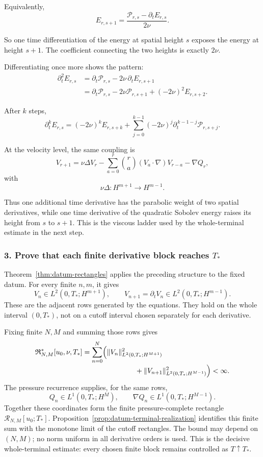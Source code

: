 \documentclass[11pt]{article}
\theoremstyle{definition}
\theoremstyle{remark}
\newcommand{\cR}{\mathcal R}
\begin{document}
Equivalently,
\[
\boxed{
E_{r,s+1}
=
\frac{\mathcal P_{r,s}-\partial_tE_{r,s}}{2\nu}.
}
\]

So one time differentiation of the energy at spatial height \(s\) exposes the
energy at height \(s+1\).  The coefficient connecting the two heights is
exactly \(2\nu\).

Differentiating once more shows the pattern:
\[
\begin{aligned}
\partial_t^2E_{r,s}
&=
\partial_t\mathcal P_{r,s}
-2\nu\,\partial_tE_{r,s+1} \\
&=
\partial_t\mathcal P_{r,s}
-2\nu\mathcal P_{r,s+1}
+(-2\nu)^2E_{r,s+2}.
\end{aligned}
\]

After \(k\) steps,
\[
\boxed{
\partial_t^kE_{r,s}
=
(-2\nu)^kE_{r,s+k}
+
\sum_{j=0}^{k-1}
(-2\nu)^j
\partial_t^{\,k-1-j}\mathcal P_{r,s+j}.
}
\]

At the velocity level, the same coupling is
\[
V_{r+1}
=
\nu\Delta V_r
-
\sum_{a=0}^{r}\binom ra(V_a\!\cdot\nabla)V_{r-a}
-\nabla Q_r,
\]
with
\[
\nu\Delta:H^{m+1}\longrightarrow H^{m-1}.
\]

Thus one additional time derivative has the parabolic weight of two spatial
derivatives, while one time derivative of the quadratic Sobolev energy raises
its height from \(s\) to \(s+1\).  This is the viscous ladder used by the
whole-terminal estimate in the next step.
\clearpage

\subsubsection*{3. Prove that each finite derivative block reaches \(T_*\)}

Theorem~\ref{thm:datum-rectangles} applies the preceding structure to the
fixed datum.  For every finite \(n,m\), it gives
\[
V_n\in L^2(0,T_*;H^{m+1}),
\qquad
V_{n+1}=\partial_tV_n\in L^2(0,T_*;H^{m-1}).
\]
These are the adjacent rows generated by the equations.  They hold on the
whole interval \((0,T_*)\), not on a cutoff interval chosen separately for
each derivative.

Fixing finite \(N,M\) and summing those rows gives
\[
\begin{aligned}
\mathfrak R^*_{N,M}[u_0,\nu,T_*]
&=\sum_{n=0}^{N}\Bigl(
\|V_n\|_{L^2(0,T_*;H^{M+1})}^2\\[-2pt]
&\hspace{7.4em}
+\|V_{n+1}\|_{L^2(0,T_*;H^{M-1})}^2
\Bigr)<\infty.
\end{aligned}
\]
The pressure recurrence supplies, for the same rows,
\[
Q_n\in L^1(0,T_*;H^M),
\qquad
\nabla Q_n\in L^1(0,T_*;H^{M-1}).
\]
Together these coordinates form the finite pressure-complete rectangle
\(\cR_{N,M}[u_0;T_*]\).  Proposition~\ref{prop:datum-terminal-realization}
identifies this finite sum with the monotone limit of the cutoff rectangles.
The bound may depend on \((N,M)\); no norm uniform in all derivative orders is
used.  This is the decisive whole-terminal estimate: every chosen finite block
remains controlled as \(T\uparrow T_*\).
\end{document}
